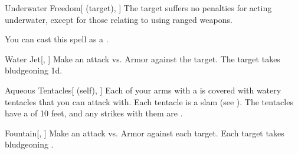 \lowercase{\hypertarget{spell:Underwater Freedom}{}}\label{spell:Underwater Freedom}
\begin{attuneability}[Rank 1]{\hypertarget{spell:Underwater Freedom}{Underwater Freedom}}[ (target), ]
The target suffers no penalties for acting underwater, except for those relating to using ranged weapons.

You can cast this spell as a .
\end{attuneability}
\vspace{0.25em}



\lowercase{\hypertarget{spell:Water Jet}{}}\label{spell:Water Jet}
\begin{freeability}[Rank 1]{\hypertarget{spell:Water Jet}{Water Jet}}[, ]
Make an attack vs. Armor against the target.
\hit The target takes bludgeoning  \plus1d.
\end{freeability}
\vspace{0.25em}



\lowercase{\hypertarget{spell:Aqueous Tentacles}{}}\label{spell:Aqueous Tentacles}
\begin{attuneability}[Rank 3]{\hypertarget{spell:Aqueous Tentacles}{Aqueous Tentacles}}[ (self), ]
Each of your arms with a  is covered with watery tentacles that you can attack with.
Each tentacle is a slam  (see ).
The tentacles have a  of 10 feet, and any strikes with them are .
\end{attuneability}
\vspace{0.25em}



\lowercase{\hypertarget{spell:Fountain}{}}\label{spell:Fountain}
\begin{freeability}[Rank 3]{\hypertarget{spell:Fountain}{Fountain}}[, ]
Make an attack vs. Armor against each target.
\hit Each target takes bludgeoning .
\end{freeability}
\vspace{0.25em}



